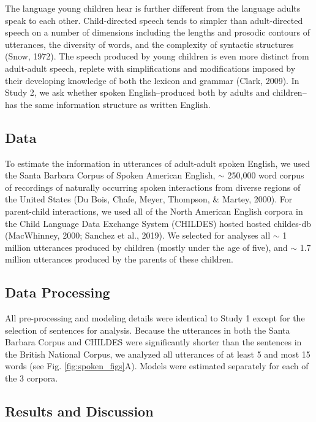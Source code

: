 \documentclass[10pt, letterpaper]{article}
\begin{document}
The language young children hear is further different from the language
adults speak to each other. Child-directed speech tends to simpler than
adult-directed speech on a number of dimensions including the lengths
and prosodic contours of utterances, the diversity of words, and the
complexity of syntactic structures (Snow, 1972). The speech produced by
young children is even more distinct from adult-adult speech, replete
with simplifications and modifications imposed by their developing
knowledge of both the lexicon and grammar (Clark, 2009). In Study 2, we
ask whether spoken English--produced both by adults and children-- has
the same information structure as written English.

\hypertarget{data-1}{%
\subsection{Data}\label{data-1}}

To estimate the information in utterances of adult-adult spoken English,
we used the Santa Barbara Corpus of Spoken American English, \(\sim\)
250,000 word corpus of recordings of naturally occurring spoken
interactions from diverse regions of the United States (Du Bois, Chafe,
Meyer, Thompson, \& Martey, 2000). For parent-child interactions, we
used all of the North American English corpora in the Child Language
Data Exchange System (CHILDES) hosted hosted childes-db (MacWhinney,
2000; Sanchez et al., 2019). We selected for analyses all \(\sim\) 1
million utterances produced by children (mostly under the age of five),
and \(\sim\) 1.7 million utterances produced by the parents of these
children.

\hypertarget{data-processing}{%
\subsection{Data Processing}\label{data-processing}}

All pre-processing and modeling details were identical to Study 1 except
for the selection of sentences for analysis. Because the utterances in
both the Santa Barbara Corpus and CHILDES were significantly shorter
than the sentences in the British National Corpus, we analyzed all
utterances of at least 5 and most 15 words (see Fig.
\ref{fig:spoken_figs}A). Models were estimated separately for each of
the 3 corpora.

\hypertarget{results-and-discussion-1}{%
\subsection{Results and Discussion}\label{results-and-discussion-1}}
\end{document}
